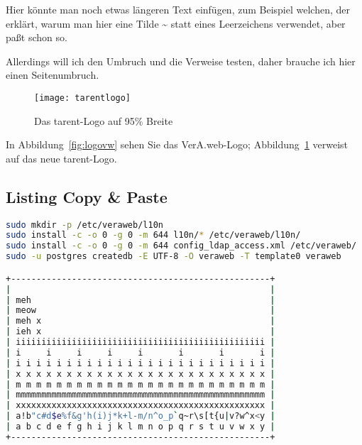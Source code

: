 \documentclass{tarentanleitung}
\begin{document}
Hier könnte man noch etwas längeren Text einfügen, zum Beispiel
welchen, der erklärt, warum man hier eine Tilde \~{} statt eines
Leerzeichens verwendet, aber paßt schon so.

\newpage

Allerdings will ich den Umbruch und die Verweise testen, daher
brauche ich hier einen Seitenumbruch.

\begin{figure}[h!]
 \centering\texttt{[image: tarentlogo]}
 \caption{Das tarent-Logo auf 95\% Breite}
 \label{fig:logotarent}
\end{figure}

In Abbildung~\ref{fig:logovw} sehen Sie das VerA.web-Logo;
Abbildung~\ref{fig:logotarent} verweist auf das neue tarent-Logo.

\subsection{Listing Copy \& Paste}

\begin{lstlisting}[language=sh]
sudo mkdir -p /etc/veraweb/l10n
sudo install -c -o 0 -g 0 -m 644 l10n/* /etc/veraweb/l10n/
sudo install -c -o 0 -g 0 -m 644 config_ldap_access.xml /etc/veraweb/
sudo -u postgres createdb -E UTF-8 -O veraweb -T template0 veraweb

+---------------------------------------------------+
|                                                   |
| meh                                               |
| meow                                              |
| meh x                                             |
| ieh x                                             |
| iiiiiiiiiiiiiiiiiiiiiiiiiiiiiiiiiiiiiiiiiiiiiiiii |
| i     i     i     i     i       i       i       i |
| i i i i i i i i i i i i i i i i i i i i i i i i i |
| x x x x x x x x x x x x x x x x x x x x x x x x x |
| m m m m m m m m m m m m m m m m m m m m m m m m m |
| mmmmmmmmmmmmmmmmmmmmmmmmmmmmmmmmmmmmmmmmmmmmmmmmm |
| xxxxxxxxxxxxxxxxxxxxxxxxxxxxxxxxxxxxxxxxxxxxxxxxx |
| a!b"c#d$e%f&g'h(i)j*k+l-m/n^o_p`q~r\s[t{u|v?w^x<y |
| a b c d e f g h i j k l m n o p q r s t u v w x y |
+---------------------------------------------------+

\end{lstlisting}
\end{document}
